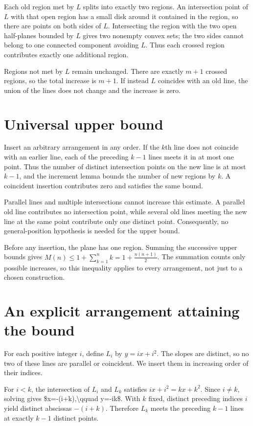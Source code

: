 \documentclass[11pt]{article}
\begin{document}
Each old region met by $L$ splits into exactly two regions. An intersection point of $L$ with that open region has a small disk around it contained in the region, so there are points on both sides of $L$. Intersecting the region with the two open half-planes bounded by $L$ gives two nonempty convex sets; the two sides cannot belong to one connected component avoiding $L$. Thus each crossed region contributes exactly one additional region.

Regions not met by $L$ remain unchanged. There are exactly $m+1$ crossed regions, so the total increase is $m+1$. If instead $L$ coincides with an old line, the union of the lines does not change and the increase is zero.

\section{Universal upper bound}
Insert an arbitrary arrangement in any order. If the $k$th line does not coincide with an earlier line, each of the preceding $k-1$ lines meets it in at most one point. Thus the number of distinct intersection points on the new line is at most $k-1$, and the increment lemma bounds the number of new regions by $k$. A coincident insertion contributes zero and satisfies the same bound.

Parallel lines and multiple intersections cannot increase this estimate. A parallel old line contributes no intersection point, while several old lines meeting the new line at the same point contribute only one distinct point. Consequently, no general-position hypothesis is needed for the upper bound.

Before any insertion, the plane has one region. Summing the successive upper bounds gives
$M(n)\leq 1+\sum_{k=1}^{n}k=1+\frac{n(n+1)}{2}$. The summation counts only possible increases, so this inequality applies to every arrangement, not just to a chosen construction.

\section{An explicit arrangement attaining the bound}
For each positive integer $i$, define $L_i$ by $y=ix+i^2$. The slopes are distinct, so no two of these lines are parallel or coincident. We insert them in increasing order of their indices.

For $i<k$, the intersection of $L_i$ and $L_k$ satisfies $ix+i^2=kx+k^2$. Since $i\neq k$, solving gives
\$x=-(i+k),\textbackslash{}qquad y=-ik\$. With $k$ fixed, distinct preceding indices $i$ yield distinct abscissas $-(i+k)$. Therefore $L_k$ meets the preceding $k-1$ lines at exactly $k-1$ distinct points.
\end{document}
